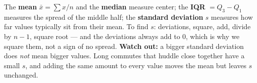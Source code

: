 \documentclass[12pt]{article}
\begin{document}
\vspace{0.14in}

\begin{remindbox}
\small
The \textbf{mean} $\bar{x} = \sum x / n$ and the \textbf{median} measure center; the
\textbf{IQR} $= Q_3 - Q_1$ measures the spread of the middle half; the \textbf{standard
deviation} $s$ measures how far values typically sit from their mean. To find $s$: deviations,
square, add, divide by $n - 1$, square root --- and the deviations always add to $0$, which is
why we square them, not a sign of no spread. \textbf{Watch out:} a bigger standard deviation does
\emph{not} mean bigger values. Long commutes that huddle close together have a small $s$, and
adding the same amount to every value moves the mean but leaves $s$ unchanged.
\end{remindbox}
\end{document}
